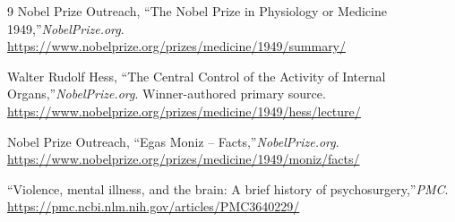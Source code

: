 \begin{thebibliography}{9}
Nobel Prize Outreach, ``The Nobel Prize in Physiology or Medicine 1949,''\emph{NobelPrize.org}.\\
\url{https://www.nobelprize.org/prizes/medicine/1949/summary/}

Walter Rudolf Hess, ``The Central Control of the Activity of Internal Organs,''\emph{NobelPrize.org}. Winner-authored primary source.\\
\url{https://www.nobelprize.org/prizes/medicine/1949/hess/lecture/}

Nobel Prize Outreach, ``Egas Moniz -- Facts,''\emph{NobelPrize.org}.\\
\url{https://www.nobelprize.org/prizes/medicine/1949/moniz/facts/}

``Violence, mental illness, and the brain: A brief history of psychosurgery,''\emph{PMC}.\\
\url{https://pmc.ncbi.nlm.nih.gov/articles/PMC3640229/}
\end{thebibliography}
